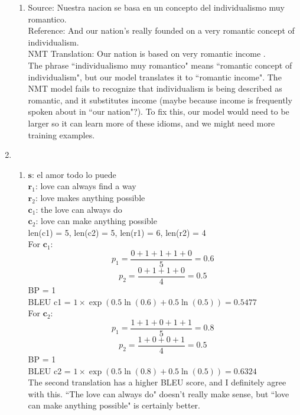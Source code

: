 \documentclass{article}
\begin{document}
\begin{enumerate}[label=(\alph*)]
\begin{enumerate}[label=\arabic*.]
        \item
        Source: Nuestra nacion se basa en un concepto del individualismo muy romantico. \\
        Reference: And our nation's really founded on a very romantic concept of individualism. \\
        NMT Translation: Our nation is based on very romantic income . \\
        The phrase ``individualismo muy romantico" means ``romantic concept of individualism", but our model translates it to ``romantic income".  The NMT model fails to recognize that individualism is being described as romantic, and it substitutes income (maybe because income is frequently spoken about in ``our nation"?). To fix this, our model would need to be larger so it can learn more of these idioms, and we might need more training examples.
    \end{enumerate}
    
    \item 
    \begin{enumerate}[label=\roman*.]
    \item
    $\textbf{s}$: el amor todo lo puede
    \\ $\textbf{r}_1$: love can always find a way
    \\ $\textbf{r}_2$: love makes anything possible
    \\ $\textbf{c}_1$: the love can always do
    \\ $\textbf{c}_2$: love can make anything possible \\
    len(c1) = 5, len(c2) = 5, len(r1) = 6, len(r2) = 4 \\
    For $\textbf{c}_1$: \\
    \[
    p_1 = \frac{0 + 1 + 1 + 1 + 0}{5} = 0.6
    \]
    \[
    p_2 = \frac{0 + 1 + 1 + 0}{4} = 0.5
    \]
    BP = 1 \\
    BLEU c1 = $1 \times \exp(0.5 \ln(0.6) + 0.5 \ln(0.5)) = \mathbf{0.5477}$ \\
    For $\textbf{c}_2$: \\
    \[
    p_1 = \frac{1 + 1 + 0 + 1 + 1}{5} = 0.8
    \]
    \[
    p_2 = \frac{1 + 0 + 0 + 1}{4} = 0.5
    \]
    BP = 1 \\
    BLEU c2 = $1 \times \exp(0.5 \ln(0.8) + 0.5 \ln(0.5)) = \mathbf{0.6324}$ \\
    The second translation has a higher BLEU score, and I definitely agree with this. ``The love can always do" doesn't really make sense, but ``love can make anything possible" is certainly better.
    

\end{enumerate}
\end{enumerate}
\end{document}
